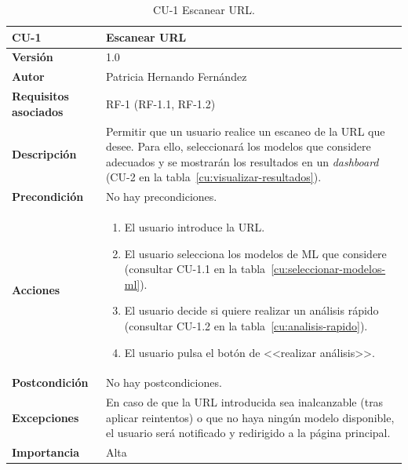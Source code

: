 \begin{table}[p]
	\centering
	\begin{tabularx}{\linewidth}{ p{} p{} }
		\toprule
		\textbf{CU-1}    & \textbf{Escanear URL}\\
		\toprule
		\textbf{Versión}              & 1.0    \\
		\textbf{Autor}                & Patricia Hernando Fernández \\
		\textbf{Requisitos asociados} & RF-1 (RF-1.1, RF-1.2) \\
		\textbf{Descripción}          & Permitir que un usuario realice un escaneo de la URL que desee. Para ello, seleccionará los modelos que considere adecuados y se mostrarán los resultados en un \textit{dashboard} (CU-2 en la tabla~\ref{cu:visualizar-resultados}). \\
		\textbf{Precondición}         & No hay precondiciones. \\
		\textbf{Acciones}             &
		\begin{enumerate}
			\def\labelenumi{\arabic{enumi}.}
			\tightlist
			\item El usuario introduce la URL.
			\item El usuario selecciona los modelos de ML que considere (consultar CU-1.1 en la tabla~\ref{cu:seleccionar-modelos-ml}).
			\item El usuario decide si quiere realizar un análisis rápido (consultar CU-1.2 en la tabla~\ref{cu:analisis-rapido}).
			\item El usuario pulsa el botón de <<realizar análisis>>.
		\end{enumerate}\\
		\textbf{Postcondición}        & No hay postcondiciones. \\
		\textbf{Excepciones}          & En caso de que la URL introducida sea inalcanzable (tras aplicar reintentos) o que no haya ningún modelo disponible, el usuario será notificado y redirigido a la página principal. \\
		\textbf{Importancia}          & Alta \\
		\bottomrule
	\end{tabularx}
	\caption{CU-1 Escanear URL.}
	\label{cu:escanear-url}
\end{table}


